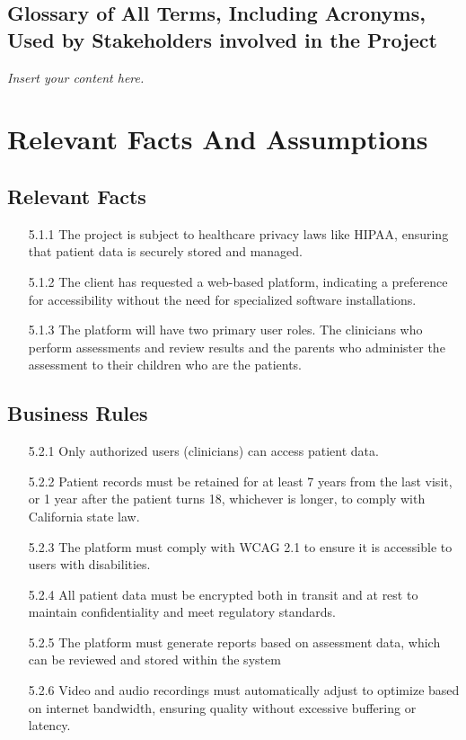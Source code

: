 \documentclass[12pt]{article}
\newcommand{\lips}{\textit{Insert your content here.}}
\begin{document}
\subsection{Glossary of All Terms, Including Acronyms, Used by Stakeholders
involved in the Project}
\lips

\section{Relevant Facts And Assumptions}
\subsection{Relevant Facts}
\begin{itemize}
  \item[5.1.1] The project is subject to healthcare privacy laws like HIPAA, ensuring that patient data is securely stored and managed.
  \item[5.1.2] The client has requested a web-based platform, indicating a preference for accessibility without the need for specialized 
  software installations.
  \item[5.1.3] The platform will have two primary user roles. The clinicians who perform assessments and review results and the parents who 
  administer the assessment to their children who are the patients.
\end{itemize}
\subsection{Business Rules}
\begin{itemize}
  \item[5.2.1] Only authorized users (clinicians) can access patient data.
  \item[5.2.2] Patient records must be retained for at least 7 years from the last visit, or 1 year after the patient turns 18, whichever is longer, 
  to comply with California state law.
  \item[5.2.3] The platform must comply with WCAG 2.1 to ensure it is accessible to users with disabilities.
  \item[5.2.4] All patient data must be encrypted both in transit and at rest to maintain confidentiality and meet regulatory standards.
  \item[5.2.5] The platform must generate reports based on assessment data, which can be reviewed and stored within the system 
  \item[5.2.6] Video and audio recordings must automatically adjust to optimize based on internet bandwidth, ensuring quality without excessive 
  buffering or latency.
\end{itemize}
\end{document}
